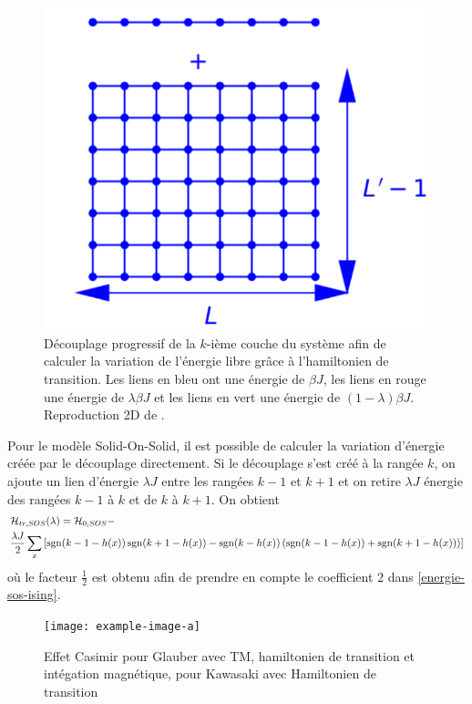 \begin{figure}
\begin{minipage}[t]{0.3\linewidth}
		\includegraphics[width=\linewidth]{numerical/cross-h1.pdf}
		\caption*{$\mH_1$}
	\end{minipage}
	\caption{Découplage progressif de la $k$-ième couche du système afin de calculer la variation de l'énergie libre grâce à l'hamiltonien de transition. Les liens en bleu ont une énergie de $\beta J$, les liens en rouge une énergie de $\lambda \beta J $ et les liens en vert une énergie de $ (1-\lambda) \beta J$. Reproduction 2D de \cite{vasilyev_monte_2007}.}
	\label{decouplage}
\end{figure}

Pour le modèle Solid-On-Solid, il est possible de calculer la variation d'énergie créée par le découplage directement. Si le découplage s'est créé à la rangée $k$, on ajoute un lien d'énergie $\lambda J$ entre les rangées $k-1$ et $k+1$ et on retire $\lambda J$ énergie des rangées $k-1$ à $k$  et de $k$ à $k+1$. On obtient
\begin{align}
    &\mathcal{H}_{tr,SOS}(\lambda) = \mathcal{H}_{0,SOS} - \nonumber \\
     &\frac{\lambda J}{2} \sum_x \left[ \operatorname{sgn}(k-1-h(x)) \operatorname{sgn}(k+1-h(x)) - \operatorname{sgn}(k-h(x)) \left( \operatorname{sgn}(k-1-h(x))+\operatorname{sgn}(k+1-h(x)) \right) \right]
\end{align}
où le facteur $\frac{1}{2}$ est obtenu afin de prendre en compte le coefficient $2$ dans \ref{energie-sos-ising}.

\begin{figure}
    \centering
	\texttt{[image: example-image-a]}
	\caption{Effet Casimir pour Glauber avec TM, hamiltonien de transition et intégation magnétique, pour Kawasaki avec Hamiltonien de transition}
\end{figure}
	

